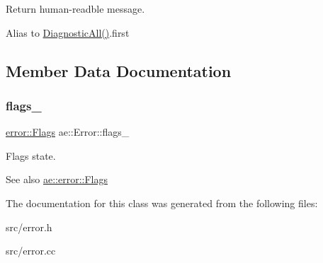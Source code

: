 Return human-\/readble message. 

Alias to \hyperlink{classae_1_1_error_ab6172fe7f6627dd726223bd4bd923693}{Diagnostic\+All()}.first 

\subsection{Member Data Documentation}
\hypertarget{classae_1_1_error_a323912fc2d0f697f2513d0c990478073}{}\label{classae_1_1_error_a323912fc2d0f697f2513d0c990478073} 
\subsubsection{\texorpdfstring{flags\+\_\+}{flags\_}}
{\footnotesize\ttfamily \hyperlink{structae_1_1error_1_1_flags}{error\+::\+Flags} ae\+::\+Error\+::flags\+\_\+\hspace{0.3cm}{\ttfamily [protected]}}



Flags state. 

\begin{DoxySeeAlso}{See also}
\hyperlink{structae_1_1error_1_1_flags}{ae\+::error\+::\+Flags} 
\end{DoxySeeAlso}


The documentation for this class was generated from the following files\+:\begin{DoxyCompactItemize}
\item 
src/error.\+h\item 
src/error.\+cc\end{DoxyCompactItemize}
